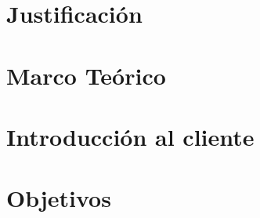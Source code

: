 \documentclass[journal]{IEEEtran}
\begin{document}
    \section{Justificación}


    \section{Marco Teórico}


    \section{Introducción al cliente}


    \section{Objetivos}

\end{document}
